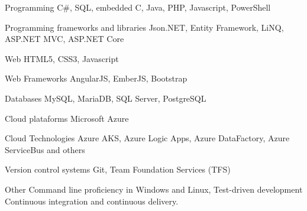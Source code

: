 


\begin{cvskills}


\cvskill
{Programming} %
{C\#, SQL, embedded C, Java, PHP, Javascript, PowerShell}


\cvskill
{Programming frameworks and libraries}
{Json.NET, Entity Framework, LiNQ, ASP.NET MVC, ASP.NET Core}


\cvskill
{Web}
{HTML5, CSS3, Javascript}


\cvskill
{Web Frameworks}
{AngularJS, EmberJS, Bootstrap}


\cvskill
{Databases}
{MySQL, MariaDB, SQL Server, PostgreSQL}


\cvskill
{Cloud plataforms}
{Microsoft Azure}

\cvskill
{Cloud Technologies} %
{Azure AKS, Azure Logic Apps, Azure DataFactory, Azure ServiceBus and others}


\cvskill
{Version control systems}
{Git, Team Foundation Services (TFS)}


\cvskill
{Other}
{Command line proficiency in Windows and Linux, 
\newline Test-driven development
\newline Continuous integration and continuous delivery.}


\end{cvskills}
